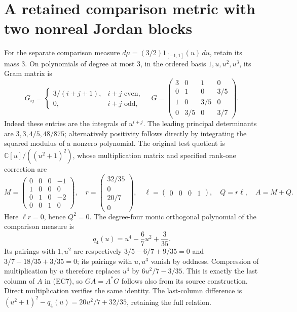 \documentclass[11pt]{article}
\newcommand{\C}{\mathbb C}
\begin{document}
\section{A retained comparison metric with two nonreal Jordan blocks}

For the separate comparison measure
\(d\mu=(3/2)1_{[-1,1]}(u)\,du\), retain its mass \(3\).
On polynomials of degree at most \(3\), in the ordered basis
\(1,u,u^2,u^3\), its Gram matrix is
\begin{equation}
 G_{ij}=
 \begin{cases}3/(i+j+1),&i+j\text{ even},\\0,&i+j\text{ odd},\end{cases}
 \quad
 G=\begin{pmatrix}
 3&0&1&0\\0&1&0&3/5\\1&0&3/5&0\\0&3/5&0&3/7
 \end{pmatrix}.
 \tag{EC6}
\end{equation}
Indeed these entries are the integrals of \(u^{i+j}\).
The leading principal determinants are
\(3,3,4/5,48/875\); alternatively positivity follows
directly by integrating the squared modulus of a nonzero polynomial.
The original test quotient is \(\C[u]/((u^2+1)^2)\), whose
multiplication matrix and specified rank-one correction are
\begin{equation}
 M=\begin{pmatrix}
 0&0&0&-1\\1&0&0&0\\0&1&0&-2\\0&0&1&0
 \end{pmatrix},\quad
 r=\begin{pmatrix}32/35\\0\\20/7\\0\end{pmatrix},\quad
 \ell=\begin{pmatrix}0&0&0&1\end{pmatrix},\quad
 Q=r\ell,\quad A=M+Q.
 \tag{EC7}
\end{equation}
Here \(\ell r=0\), hence \(Q^2=0\).
The degree-four monic orthogonal polynomial of the comparison measure is
\[
 q_4(u)=u^4-\frac67u^2+\frac3{35}.
\]
Its pairings with \(1,u^2\) are respectively
\(3/5-6/7+9/35=0\) and
\(3/7-18/35+3/35=0\); its pairings with \(u,u^3\)
vanish by oddness. Compression of multiplication by \(u\)
therefore replaces \(u^4\) by \(6u^2/7-3/35\).
This is exactly the last column of \(A\) in (EC7), so
\(GA=A^*G\) follows also from its source construction.
Direct multiplication verifies the same identity.
The last-column difference is
\((u^2+1)^2-q_4(u)=20u^2/7+32/35\), retaining the full relation.
\end{document}
